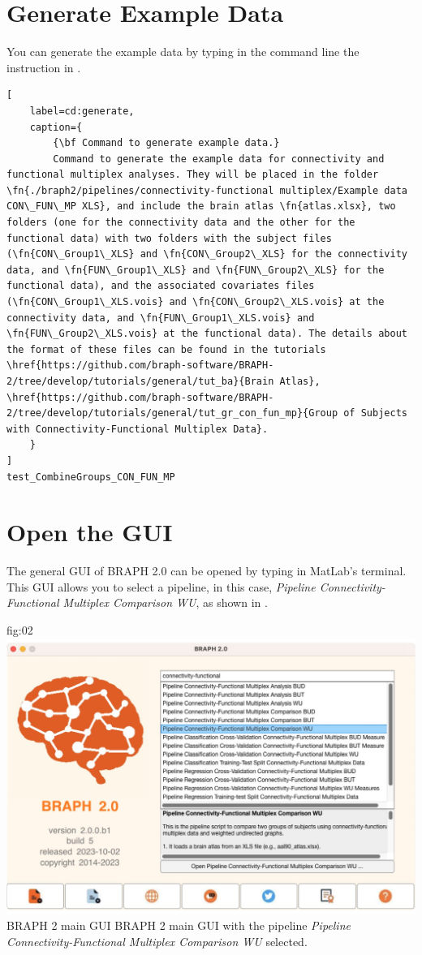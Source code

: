 \documentclass[justified]{tufte-handout}
\begin{document}
\tableofcontents

\clearpage
\section{Generate Example Data}

You can generate the example data by typing in the command line the instruction in .
%
\begin{lstlisting}[
	label=cd:generate,
	caption={
		{\bf Command to generate example data.}
		Command to generate the example data for connectivity and functional multiplex analyses. They will be placed in the folder \fn{./braph2/pipelines/connectivity-functional multiplex/Example data CON\_FUN\_MP XLS}, and include the brain atlas \fn{atlas.xlsx}, two folders (one for the connectivity data and the other for the functional data) with two folders with the subject files (\fn{CON\_Group1\_XLS} and \fn{CON\_Group2\_XLS} for the connectivity data, and \fn{FUN\_Group1\_XLS} and \fn{FUN\_Group2\_XLS} for the functional data), and the associated covariates files (\fn{CON\_Group1\_XLS.vois} and \fn{CON\_Group2\_XLS.vois} at the connectivity data, and \fn{FUN\_Group1\_XLS.vois} and \fn{FUN\_Group2\_XLS.vois} at the functional data). The details about the format of these files can be found in the tutorials \href{https://github.com/braph-software/BRAPH-2/tree/develop/tutorials/general/tut_ba}{Brain Atlas}, \href{https://github.com/braph-software/BRAPH-2/tree/develop/tutorials/general/tut_gr_con_fun_mp}{Group of Subjects with Connectivity-Functional Multiplex Data}.
	}
]
test_CombineGroups_CON_FUN_MP
\end{lstlisting}

\section{Open the GUI}

The general GUI of BRAPH 2.0 can be opened by typing  in MatLab's terminal. This GUI allows you to select a pipeline, in this case, \emph{Pipeline Connectivity-Functional Multiplex Comparison WU}, as shown in .

	{fig:02}
	{
	\includegraphics{fig02.jpg}
	}
	{BRAPH 2 main GUI}
	{
	BRAPH 2 main GUI with the pipeline \emph{Pipeline Connectivity-Functional Multiplex Comparison WU} selected.
	}
\end{document}
